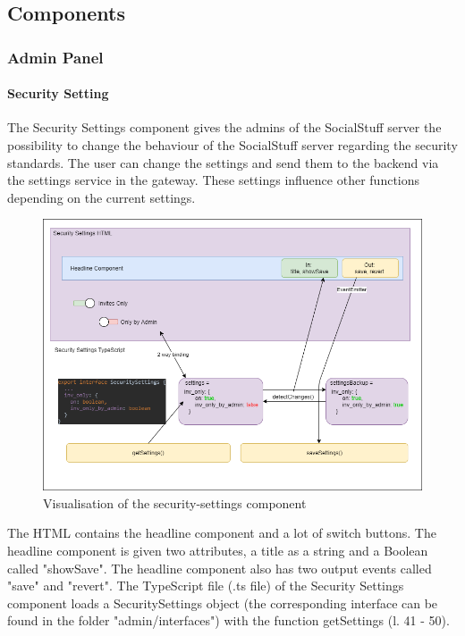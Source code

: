 \subsection{Components}

\subsubsection{Admin Panel}

\paragraph{Security Setting}
The Security Settings component gives the admins of the SocialStuff server the possibility to change the behaviour of the SocialStuff server
regarding the security standards. The user can change the settings and send them to the backend via the settings service in the gateway.
These settings influence other functions depending on the current settings.
\begin{figure}[h]
    \centering
    \includegraphics[width=1.0\textwidth]{./images/security_settings}
    \caption{Visualisation of the security-settings component}
    \label{fig:secset}
\end{figure}
The HTML contains the headline component and a lot of switch buttons. The headline component is given two attributes,
a title as a string and a Boolean called "showSave". The headline component also has two output events called "save" and "revert".
The TypeScript file (.ts file) of the Security Settings component loads a SecuritySettings object (the corresponding interface can be found in the folder "admin/interfaces") with the function getSettings (l. 41 - 50).

